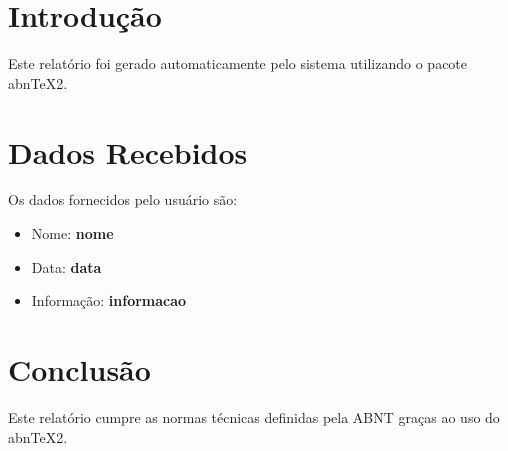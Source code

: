 \documentclass[
    12pt,
    openright,
    oneside,
    a4paper,
    chapter=TITLE,
    section=TITLE,
    sumario=tradicional
]{abntex2}
\begin{document}
\imprimircapa
\imprimirfolhaderosto

\tableofcontents
\newpage

\chapter{Introdução}

Este relatório foi gerado automaticamente pelo sistema utilizando o pacote abnTeX2.

\chapter{Dados Recebidos}

Os dados fornecidos pelo usuário são:

\begin{itemize}
    \item Nome: \textbf{ {{ nome }} }
    \item Data: \textbf{ {{ data }} }
    \item Informação: \textbf{ {{ informacao }} }
\end{itemize}

\chapter{Conclusão}

Este relatório cumpre as normas técnicas definidas pela ABNT graças ao uso do abnTeX2.
\end{document}
